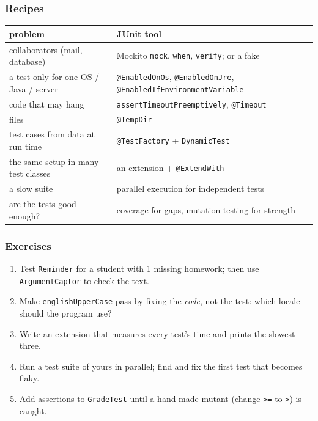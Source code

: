 \documentclass[aspectratio=169,10pt,compress]{beamer}
\begin{document}
\begin{frame}[t,fragile] \frametitle{Recipes}
  \begin{center}\footnotesize
  \begin{tabular}{@{}L{0.34\textwidth}L{0.6\textwidth}@{}}
    \toprule
    \textbf{problem}                       & \textbf{JUnit tool} \\
    \midrule
    collaborators (mail, database)         & Mockito \texttt{mock}, \texttt{when}, \texttt{verify}; or a fake \\
    a test only for one OS / Java / server & \texttt{@EnabledOnOs}, \texttt{@EnabledOnJre}, \texttt{@EnabledIfEnvironmentVariable} \\
    code that may hang                     & \texttt{assertTimeoutPreemptively}, \texttt{@Timeout} \\
    files                                  & \texttt{@TempDir} \\
    test cases from data at run time       & \texttt{@TestFactory} + \texttt{DynamicTest} \\
    the same setup in many test classes    & an extension + \texttt{@ExtendWith} \\
    a slow suite                           & parallel execution for independent tests \\
    are the tests good enough?             & coverage for gaps, mutation testing for strength \\
    \bottomrule
  \end{tabular}
  \end{center}
\end{frame}




\begin{frame}[t,fragile] \frametitle{Exercises}
  \begin{enumerate}\small
    \item Test \texttt{Reminder} for a student with 1 missing homework; then use \texttt{ArgumentCaptor} to check the text.
    \item Make \texttt{englishUpperCase} pass by fixing the \emph{code}, not the test: which locale should the program use?
    \item Write an extension that measures every test's time and prints the slowest three.
    \item Run a test suite of yours in parallel; find and fix the first test that becomes flaky.
    \item Add assertions to \texttt{GradeTest} until a hand-made mutant (change \texttt{>=} to \texttt{>}) is caught.
  \end{enumerate}
\end{frame}




\begin{frame}[t,fragile]
	\begin{center}
		\vspace{4cm}
	\end{center}
\end{frame}
\end{document}
